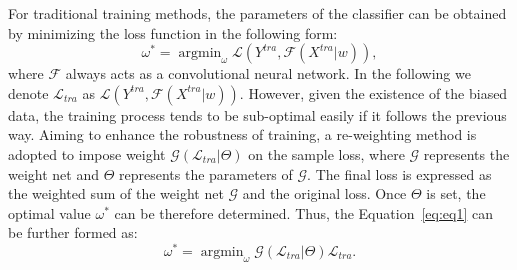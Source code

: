 \documentclass[letterpaper]{article} %
\begin{document}
For traditional training methods, the parameters of the classifier can be obtained by minimizing the loss function in the following form:
\begin{equation}
\omega^* = \mathop{\arg\min}_\omega \mathcal{L}(Y^{tra},\mathcal{F}(X^{tra}|w)),
\label{eq:eq1}
\end{equation}
where $\mathcal{F}$ always acts as a convolutional neural network.
In the following we denote $\mathcal{L}_{tra}$ as $\mathcal{L}(Y^{tra},\mathcal{F}(X^{tra}|w))$.
However, given the existence of the biased data, the training process tends to be sub-optimal easily if it follows the previous way.
Aiming to enhance the robustness of training, a re-weighting method is adopted to impose weight $\mathcal{G}(\mathcal{L}_{tra}|\Theta)$ on the sample loss, where $\mathcal{G}$ represents the weight net and $\Theta$ represents the parameters of $\mathcal{G}$.
The final loss is expressed as the weighted sum of the weight net $\mathcal{G}$ and the original loss.
Once $\Theta$ is set, the optimal value $\omega^*$ can be therefore determined.
Thus, the Equation~\ref{eq:eq1} can be further formed as:
\begin{equation}
\omega^*  = \mathop{\arg\min}_\omega  \mathcal{G}(\mathcal{L}_{tra} |\Theta)\mathcal{L}_{tra}.
\end{equation}
\end{document}
